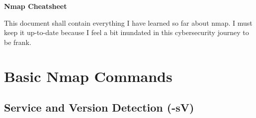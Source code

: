 \documentclass[11pt,a4paper]{article}
\begin{document}
\begin{center}
    \begin{tcolorbox}[width=\textwidth, colback=sectioncolor!20, colframe=sectioncolor]
        \centering
        {\Huge \textbf{Nmap Cheatsheet}}\\[0.5em]
    \end{tcolorbox}
\end{center}

\tableofcontents
\clearpage

\vspace{1em}
\begin{tcolorbox}[colback=codebackground, colframe=warningcolor]
    This document shall contain everything I have learned so far about nmap. I must keep it up-to-date because I feel a bit inundated in this cybersecurity journey to be frank.
\end{tcolorbox}

\section{Basic Nmap Commands}

\subsection{Service and Version Detection (-sV)}
\end{document}
